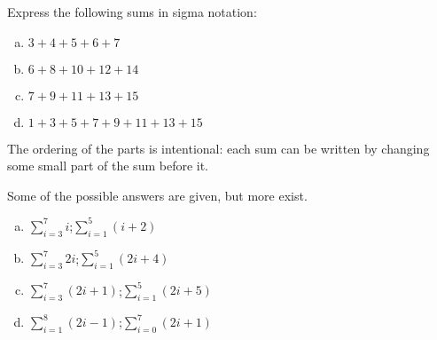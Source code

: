 \begin{question}\label{1.1sigmaa}
Express the following sums in sigma notation:
\begin{enumerate}[(a)]
\item $3+4+5+6+7$
\item $6+8+10+12+14$
\item $7+9+11+13+15$
\item $1+3+5+7+9+11+13+15$
\end{enumerate}
\end{question}
\begin{hint} The ordering of the parts is intentional: each sum can be written by changing some small part of the sum before it.
\end{hint}
\begin{answer} Some of the possible answers are given, but more exist.
\begin{enumerate}[(a)]
\item $\displaystyle\sum_{i=3}^7 i$\quad;\quad $\displaystyle\sum_{i=1}^5 (i+2)$
\item $\displaystyle\sum_{i=3}^7 2i$\quad;\quad $\displaystyle\sum_{i=1}^5 (2i+4)$
\item $\displaystyle\sum_{i=3}^7 (2i+1)$\quad;\quad $\displaystyle\sum_{i=1}^5 (2i+5)$
\item $\displaystyle\sum_{i=1}^8 (2i-1)$\quad;\quad$\displaystyle\sum_{i=0}^7 (2i+1)$
\end{enumerate}
\end{answer}
